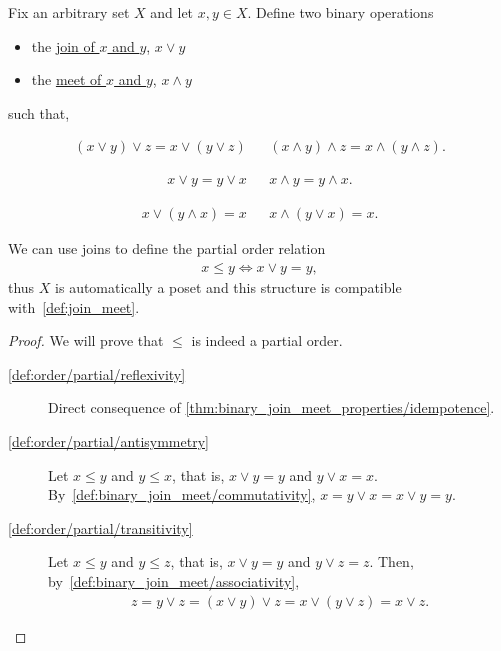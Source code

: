 \begin{definition}\label{def:binary_join_meet}
  Fix an arbitrary set $X$ and let $x, y \in X$. Define two binary operations
  \begin{itemize}
    \item the \ul{join of $x$ and $y$}, $x \lor y$
    \item the \ul{meet of $x$ and $y$}, $x \land y$
  \end{itemize}
  such that,
  \begin{description}
    \begin{align*}
      (x \lor y) \lor z = x \lor (y \lor z)
      &&
      (x \land y) \land z = x \land (y \land z).
    \end{align*}

    \begin{align*}
      x \lor y = y \lor x
      &&
      x \land y = y \land x.
    \end{align*}

    \begin{align*}
      x \lor (y \land x) = x
      &&
      x \land (y \lor x) = x.
    \end{align*}
  \end{description}

  We can use joins to define the partial order relation
  \begin{align*}
    x \leq y \iff x \lor y = y,
  \end{align*}
  thus $X$ is automatically a poset and this structure is compatible with~\cref{def:join_meet}.
\end{definition}
\begin{proof}
  We will prove that $\leq$ is indeed a partial order.
  \begin{description}
    \item[\ref{def:order/partial/reflexivity}] Direct consequence of \cref{thm:binary_join_meet_properties/idempotence}.
    \item[\ref{def:order/partial/antisymmetry}] Let $x \leq y$ and $y \leq x$, that is, $x \lor y = y$ and $y \lor x = x$. By~\ref{def:binary_join_meet/commutativity}, $x = y \lor x = x \lor y = y$.
    \item[\ref{def:order/partial/transitivity}] Let $x \leq y$ and $y \leq z$, that is, $x \lor y = y$ and $y \lor z = z$. Then, by~\ref{def:binary_join_meet/associativity},
    \begin{align*}
      z = y \lor z = (x \lor y) \lor z = x \lor (y \lor z) = x \lor z.
    \end{align*}
  \end{description}
\end{proof}

